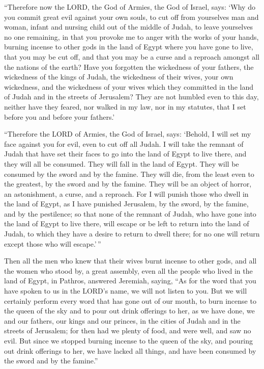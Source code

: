  ``Therefore now the LORD, the God of Armies, the God of
Israel, says: `Why do you commit great evil against your own souls, to
cut off from yourselves man and woman, infant and nursing child out of
the middle of Judah, to leave yourselves no one remaining,
 in that you provoke me to anger with the works of your
hands, burning incense to other gods in the land of Egypt where you have
gone to live, that you may be cut off, and that you may be a curse and a
reproach amongst all the nations of the earth?  Have you
forgotten the wickedness of your fathers, the wickedness of the kings of
Judah, the wickedness of their wives, your own wickedness, and the
wickedness of your wives which they committed in the land of Judah and
in the streets of Jerusalem?  They are not humbled even
to this day, neither have they feared, nor walked in my law, nor in my
statutes, that I set before you and before your fathers.'

 ``Therefore the LORD of Armies, the God of Israel, says:
`Behold, I will set my face against you for evil, even to cut off all
Judah.  I will take the remnant of Judah that have set
their faces to go into the land of Egypt to live there, and they will
all be consumed. They will fall in the land of Egypt. They will be
consumed by the sword and by the famine. They will die, from the least
even to the greatest, by the sword and by the famine. They will be an
object of horror, an astonishment, a curse, and a reproach.
 For I will punish those who dwell in the land of Egypt,
as I have punished Jerusalem, by the sword, by the famine, and by the
pestilence;  so that none of the remnant of Judah, who
have gone into the land of Egypt to live there, will escape or be left
to return into the land of Judah, to which they have a desire to return
to dwell there; for no one will return except those who will
escape.'\,''

 Then all the men who knew that their wives burnt incense
to other gods, and all the women who stood by, a great assembly, even
all the people who lived in the land of Egypt, in Pathros, answered
Jeremiah, saying,  ``As for the word that you have spoken
to us in the LORD's name, we will not listen to you.  But
we will certainly perform every word that has gone out of our mouth, to
burn incense to the queen of the sky and to pour out drink offerings to
her, as we have done, we and our fathers, our kings and our princes, in
the cities of Judah and in the streets of Jerusalem; for then had we
plenty of food, and were well, and saw no evil.  But
since we stopped burning incense to the queen of the sky, and pouring
out drink offerings to her, we have lacked all things, and have been
consumed by the sword and by the famine.''


